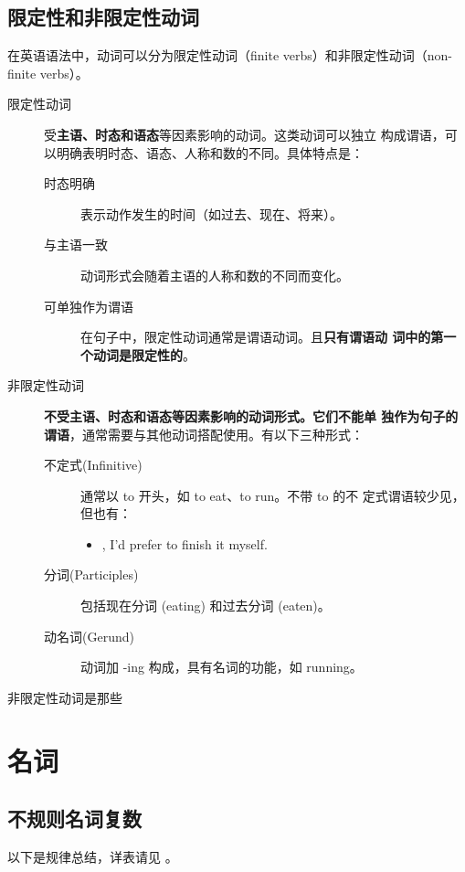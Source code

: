 \subsection{限定性和非限定性动词}
\label{subsec:iffinite}

在英语语法中，动词可以分为限定性动词（finite verbs）和非限定性动词（non-finite
verbs）。
\begin{description}
\item[限定性动词] 受\textbf{主语、时态和语态}等因素影响的动词。这类动词可以独立
  构成谓语，可以明确表明时态、语态、人称和数的不同。具体特点是：
  \begin{description}
  \item[时态明确] 表示动作发生的时间（如过去、现在、将来）。
  \item[与主语一致] 动词形式会随着主语的人称和数的不同而变化。
  \item[可单独作为谓语] 在句子中，限定性动词通常是谓语动词。且\textbf{只有谓语动
      词中的第一个动词是限定性的}。
  \end{description}

\item[非限定性动词] \textbf{不受主语、时态和语态等因素影响的动词形式。它们不能单
    独作为句子的谓语}，通常需要与其他动词搭配使用。有以下三种形式：
  \begin{description}
  \item[不定式(Infinitive)] 通常以 to 开头，如 to eat、to run。不带 to 的不
    定式谓语较少见，但也有：
    \begin{itemize}
    \item {}, I'd prefer to finish it myself.
    \end{itemize}
  \item[分词(Participles)] 包括现在分词 (eating) 和过去分词 (eaten)。
  \item[动名词(Gerund)] 动词加 -ing 构成，具有名词的功能，如 running。
  \end{description}
\end{description}


非限定性动词是那些
\section{名词}

\subsection{不规则名词复数}

以下是规律总结，详表请见 。

